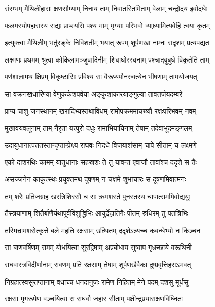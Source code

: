 \twolineshloka
{संरम्भम् मैथिलीहासः क्षणसौम्याम् निनाय ताम्}
{निवातस्तिमिताम् वेलाम् चन्द्रोदय इवोदधेः} %

\twolineshloka
{फलमस्योपहासस्य सद्यः प्राप्स्यसि पश्य माम्}
{मृग्याः परिभवो व्याघ्र्यामित्यवेहि त्वया कृतम्} %

\twolineshloka
{इत्युक्त्वा मैथिलीम् भर्तुरङ्के निविशतीम् भयात्}
{रूपम् शूर्पणखा नाम्नः सदृशम् प्रत्यपद्यत} %

\twolineshloka
{लक्ष्मणः प्रथमम् श्रुत्वा कोकिलामञ्जुवादिनीम्}
{शिवाघोरस्वनाम् पश्चाद्बुबुधे विकृतेति ताम्} %

\twolineshloka
{पर्णशालामथ क्षिप्रम् विकृष्टासिः प्रविश्य सः}
{वैरूप्यपौनरुक्त्येन भीषणाम् तामयोजयत्} %

\twolineshloka
{सा वक्रनखधारिण्या वेणुकर्कशपर्वया}
{अङ्कुशाकारयाङ्गुल्या तावतर्जयदम्बरे} %

\twolineshloka
{प्राप्य चाशु जनस्थानम् खरादिभ्यस्तथाविधम्}
{रामोपक्रममाचख्यौ रक्षःपरिभवम् नवम्} %

\twolineshloka
{मुखावयवलूनाम् ताम् नैरृता यत्पुरो दधुः}
{रामाभियायिनाम् तेषाम् तदेवाभूदमङ्गलम्} %

\twolineshloka
{उदायुधानात्पततस्तान्दृप्तान्प्रेक्ष्य राघवः}
{निदधे विजयाशंसाम् चापे सीताम् च लक्ष्मणे} %

\twolineshloka
{एको दाशरथिः कामम् यातुधानाः सहस्रशः}
{ते तु यावन्त एवाजौ तावांश्च ददृशे स तैः} %

\twolineshloka
{असज्जनेन काकुत्स्थः प्रयुक्तमथ दूषणम्}
{न चक्षमे शुभाचारः स दूषणमिवात्मनः} %

\twolineshloka
{तम् शरैः प्रतिजग्राह खरत्रिशिरसौ च सः}
{क्रमशस्ते पुनस्तस्य चापात्सममिवोद्ययुः} %

\twolineshloka
{तैस्त्रयाणाम् शितैर्बाणैर्यथापूर्वविशुद्धिभिः}
{आयुर्देहातिगैः पीतम् रुधिरम् तु पतत्रिभिः} %

\twolineshloka
{तस्मिन्रामशरोत्कृत्ते बले महति रक्षसाम्}
{उत्थितम् ददृशेऽन्न्यच्च कबन्धेभ्यो न किञ्चन} %

\twolineshloka
{सा बाणवर्षिणम् रामम् योधयित्वा सुरद्विषाम्}
{अप्रबोधाय सुष्वाप गृध्रच्छाये वरूथिनी} %

\twolineshloka
{राघवास्त्रविदीर्णानाम् रावणम् प्रति रक्षसाम्}
{तेषाम् शूर्पणखैवैका दुष्प्रवृत्तिहराऽभवत्} %

\twolineshloka
{निग्रहात्स्वसुराप्तानाम् वधाच्च धनदानुजः}
{रामेण निहितम् मेने पदम् दशसु मूर्धसु} %

\twolineshloka
{रक्षसा मृगरूपेण वञ्चयित्वा स राघवौ}
{जहार सीताम् पक्षीन्द्रप्रयासक्षणविघ्नितः} %

